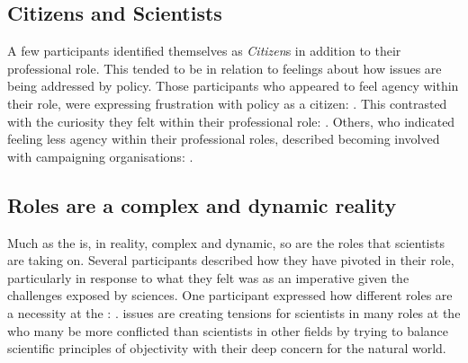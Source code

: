 
\subsection{Citizens and Scientists}

A few participants identified themselves as \emph{Citizen}s in addition to their professional role. This tended to be in relation to feelings about how \CAN{} issues are being addressed by policy. Those participants who appeared to feel agency within their role, were expressing frustration with policy as a citizen: . This contrasted with the curiosity they felt within their professional role: . Others, who indicated feeling less agency within their professional roles, described becoming involved with campaigning organisations: .

\subsection{Roles are a complex and dynamic reality}

Much as the \SPI{} is, in reality, complex and dynamic, so are the roles that scientists are taking on. Several participants described how they have pivoted in their role, particularly in response to what they felt was as an imperative given the challenges exposed by \CAN{} sciences. %
One participant expressed how different roles are a necessity at the \CAN{} \SPI: . \CAN{} issues are creating tensions for scientists in many roles at the \SPI{} who many be more conflicted than scientists in other fields by trying to balance scientific principles of objectivity with their deep concern for the natural world.


